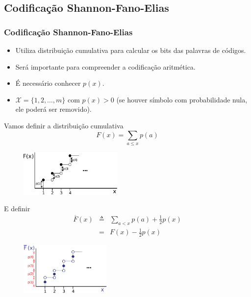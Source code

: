 \subsection{Codificação Shannon-Fano-Elias}

\begin{frame}[allowframebreaks]
  \frametitle{Codificação Shannon-Fano-Elias}
  \begin{itemize}
  \item Utiliza distribuição cumulativa para calcular os bits das palavras de códigos.
  \item Será importante para compreender a codificação aritmética.
  \item É necessário conhecer $p(x)$.
  \item $\mathcal{X} = \{1,2, \ldots, m\}$ com $p(x)>0$ (se houver símbolo com probabilidade nula, 
	ele poderá ser removido).
  \end{itemize}

  \framebreak
  Vamos definir a distribuição cumulativa 
  \begin{equation}
  F(x) = \sum_{a \leq x} p(a)
  \end{equation}

	\begin{figure}[h!]
	\centering
	\includegraphics[width=0.45\textwidth]{images/cumulative.pdf}
	\label{fig:cumulative}
	\end{figure}


  \framebreak
  E definir 
  \begin{eqnarray}
  \overline{F}(x) &\triangleq& \sum_{a < x} p(a) + \frac{1}{2} p(x) \\
	&=& F(x) - \frac{1}{2} p(x)
  \end{eqnarray}

        \begin{figure}[h!]
        \centering
        \includegraphics[width=0.4\textwidth]{images/Fbarra.pdf}
        \label{fig:Fbarra}
        \end{figure}


\end{frame}
